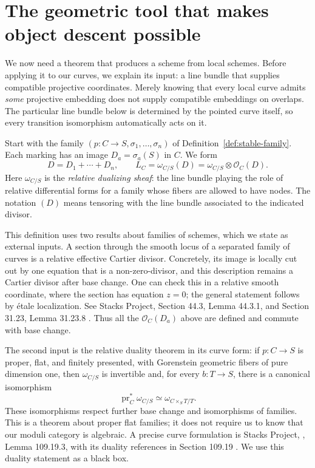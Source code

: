 \section{The geometric tool that makes object descent possible}
\label{desc:tools}

We now need a theorem that produces a scheme from local schemes.
Before applying it to our curves, we explain its input: a line bundle
that supplies compatible projective coordinates. Merely knowing that
every local curve admits \emph{some} projective embedding does not supply
compatible embeddings on overlaps. The particular line bundle below is
determined by the pointed curve itself, so every transition isomorphism
automatically acts on it.

\begin{Def}
\label{desc:canonical-bundle}
Start with the family $(p:C\to S,\sigma_1,\ldots,\sigma_n)$ of
Definition~\ref{def:stable-family}. Each marking has an image
$D_a=\sigma_a(S)$ in $C$. We form
\[
 D=D_1+\cdots+D_n,
 \qquad L_C=\omega_{C/S}(D)
       =\omega_{C/S}\otimes\mathcal O_C(D).
\]
Here $\omega_{C/S}$ is the \emph{relative dualizing sheaf}: the line
bundle playing the role of relative differential forms for a family
whose fibers are allowed to have nodes. The notation $(D)$ means
tensoring with the line bundle associated to the indicated divisor.
\end{Def}

This definition uses two results about families of schemes, which we
state as external inputs. A section through the smooth locus of a
separated family of curves is a relative effective Cartier divisor.
Concretely, its image is locally cut out by one equation that is a
non-zero-divisor, and this description remains a Cartier divisor after
base change. One can check this in a relative smooth coordinate, where
the section has equation $z=0$; the general statement follows by
\'etale localization. See Stacks Project, Section 44.3,
Lemma 44.3.1, and Section 31.23, Lemma 31.23.8
\cite{Stacks}. Thus all the $\mathcal O_C(D_a)$ above are defined and
commute with base change.

The second input is the relative duality theorem in its curve form:
if $p:C\to S$ is proper, flat, and finitely presented, with
Gorenstein geometric fibers of pure dimension one, then
$\omega_{C/S}$ is invertible and, for every $b:T\to S$, there is a
canonical isomorphism
\begin{equation}\label{desc:dualizing-basechange}
 \operatorname{pr}_C^*\omega_{C/S}
       \simeq \omega_{C\times_S T/T}.
\end{equation}
These isomorphisms respect further base change and isomorphisms of
families. This is a theorem about proper flat families; it does not
require us to know that our moduli category is algebraic. A precise
curve formulation is Stacks Project, ,
Lemma 109.19.3, with its duality references in Section 109.19
\cite{Stacks}. We use this duality statement as a black box.

